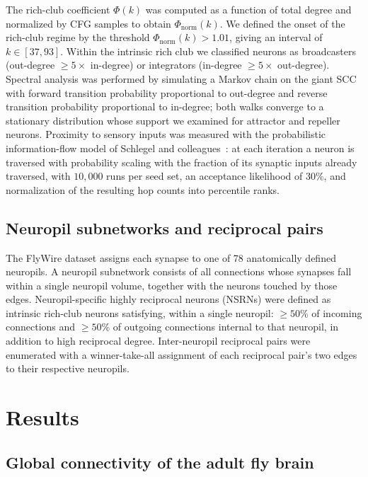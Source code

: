 \documentclass[11pt]{article}
\begin{document}
The rich-club coefficient $\Phi(k)$ was computed as a function of total
degree and normalized by CFG samples to obtain
$\Phi_{\mathrm{norm}}(k)$. We defined the onset of the rich-club regime by
the threshold $\Phi_{\mathrm{norm}}(k) > 1.01$, giving an interval of
$k \in [37, 93]$. Within the intrinsic rich club we classified neurons as
broadcasters (out-degree $\geq 5\times$ in-degree) or integrators
(in-degree $\geq 5\times$ out-degree). Spectral analysis was performed by
simulating a Markov chain on the giant SCC with forward transition
probability proportional to out-degree and reverse transition probability
proportional to in-degree; both walks converge to a stationary
distribution whose support we examined for attractor and repeller
neurons. Proximity to sensory inputs was measured with the probabilistic
information-flow model of Schlegel and
colleagues~\cite{dorkenwald2024flywire,schlegel2024whole}: at each
iteration a neuron is traversed with probability scaling with the fraction
of its synaptic inputs already traversed, with $10{,}000$ runs per seed
set, an acceptance likelihood of 30\%, and normalization of the resulting
hop counts into percentile ranks.

\subsection{Neuropil subnetworks and reciprocal pairs}

The FlyWire dataset assigns each synapse to one of 78 anatomically defined
neuropils. A neuropil subnetwork consists of all connections whose
synapses fall within a single neuropil volume, together with the neurons
touched by those edges. Neuropil-specific highly reciprocal neurons
(NSRNs) were defined as intrinsic rich-club neurons satisfying, within a
single neuropil: $\geq 50\%$ of incoming connections and $\geq 50\%$ of
outgoing connections internal to that neuropil, in addition to high
reciprocal degree. Inter-neuropil reciprocal pairs were enumerated with a
winner-take-all assignment of each reciprocal pair's two edges to their
respective neuropils.

\section{Results}

\subsection{Global connectivity of the adult fly brain}
\end{document}
